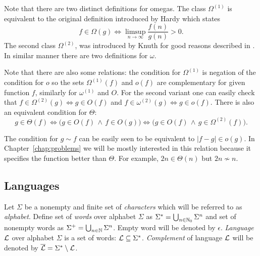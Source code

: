 		\begin{remark}
			Note that there are two distinct definitions for omegas. The class $\Omega^{(1)}$ is equivalent to the original definition introduced by Hardy \cite{hardy1914} which states
			\begin{equation*}
				f \in \Omega(g) \iff \limsup\limits_{n\to\infty}\frac{f(n)}{g(n)} > 0 .
			\end{equation*}
			The second class $\Omega^{(2)}$, was introduced by Knuth for good reasons described in \cite{knuth76}. In similar manner there are two definitions for $\omega$.
		\end{remark}
		\begin{remark}
			Note that there are also some relations: the condition for $\Omega^{(1)}$ is negation of the condition for $o$ so the sets $\Omega^{(1)}(f)$ and $o(f)$ are complementary for given function $f$, similarly for $\omega^{(1)}$ and $O$. For the second variant one can easily check that $f\in\Omega^{(2)}(g)\iff g\in O(f)$ and $f\in\omega^{(2)}(g)\iff g\in o(f)$. There is also an equivalent condition for $\Theta$:
			\begin{equation*}
				g \in \Theta(f) \iff \bigl(g \in O(f) \,\wedge\, f \in O(g)\bigr) \iff \bigl(g \in O(f) \,\wedge\, g \in \Omega^{(2)}(f)\bigr) .
			\end{equation*}
		\end{remark}
		\begin{remark}
		\label{rem:tilde}
			The condition for $g \sim f$ can be easily seen to be equivalent to $|f-g| \in o(g)$. In Chapter~\ref{chap:problems} we will be mostly interested in this relation because it specifies the function better than $\Theta$. For example, $2n \in \Theta(n)$ but $2n \not\sim n$.
		\end{remark}
	
	\subsection{Languages}
		
		\begin{defn}
			Let $\Sigma$ be a nonempty and finite set of {\em characters} which will be referred to as {\em alphabet}. Define set of {\em words} over alphabet $\Sigma$ as $\Sigma^* = \bigcup_{n\in\mathbb{N}_0}\Sigma^n$ and set of nonempty words as $\Sigma^+ = \bigcup_{n\in\mathbb{N}}\Sigma^n$. Empty word will be denoted by $\epsilon$. {\em Language} ${\cal L}$ over alphabet $\Sigma$ is a set of words: ${\cal L} \subseteq \Sigma^*$. {\em Complement} of language $\cal L$ will be denoted by ${\cal\overline L} = \Sigma^* \setminus {\cal L}$.
		\end{defn}
		
